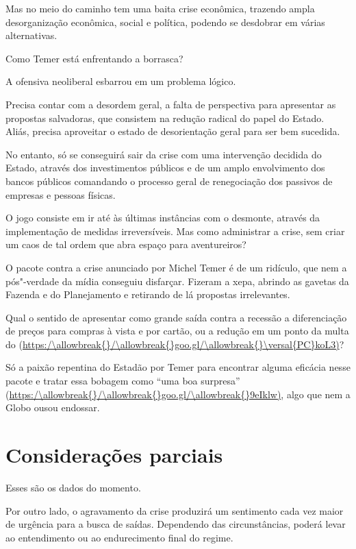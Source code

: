 Mas no meio do caminho tem uma baita crise econômica, trazendo ampla
desorganização econômica, social e política, podendo se desdobrar em
várias alternativas.

Como Temer está enfrentando a borrasca?

A ofensiva neoliberal esbarrou em um problema lógico.

Precisa contar com a desordem geral, a falta de perspectiva para
apresentar as propostas salvadoras, que consistem na redução radical do
papel do Estado. Aliás, precisa aproveitar o estado de desorientação
geral para ser bem sucedida.

No entanto, só se conseguirá sair da crise com uma intervenção decidida
do Estado, através dos investimentos públicos e de um amplo envolvimento
dos bancos públicos comandando o processo geral de renegociação dos
passivos de empresas e pessoas físicas.

O jogo consiste em ir até às últimas instâncias com o desmonte, através
da implementação de medidas irreversíveis. Mas como administrar a crise,
sem criar um caos de tal ordem que abra espaço para aventureiros?

O pacote contra a crise anunciado por Michel Temer é de um ridículo, que
nem a pós"-verdade da mídia conseguiu disfarçar. Fizeram a xepa, abrindo
as gavetas da Fazenda e do Planejamento e retirando de lá propostas
irrelevantes.

Qual o sentido de apresentar como grande saída contra a recessão a
diferenciação de preços para compras à vista e por cartão, ou a redução
em um ponto da multa do  (\url{https:/\allowbreak{}/\allowbreak{}goo.gl/\allowbreak{}\versal{PC}koL3)}?

Só a paixão repentina do Estadão por Temer para encontrar alguma
eficácia nesse pacote e tratar essa bobagem como ``uma boa surpresa''
(\url{https:/\allowbreak{}/\allowbreak{}goo.gl/\allowbreak{}9eIklw)}, algo que nem a Globo ousou endossar.

\section{Considerações parciais}

Esses são os dados do momento.

Por outro lado, o agravamento da crise produzirá um sentimento cada vez
maior de urgência para a busca de saídas. Dependendo das circunstâncias,
poderá levar ao entendimento ou ao endurecimento final do regime.

